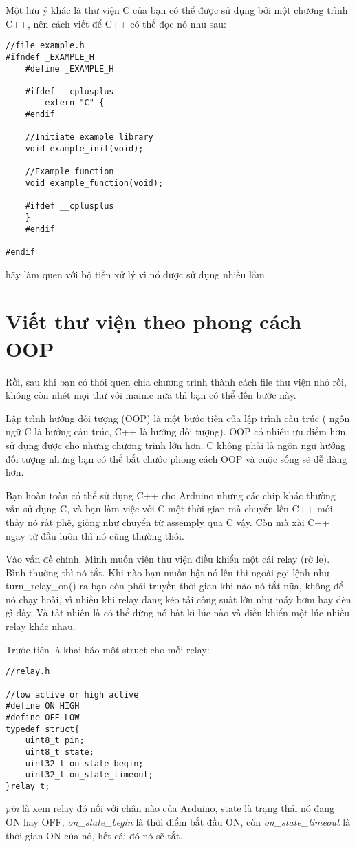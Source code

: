 Một lưu ý khác là thư viện C của bạn có thể được sử dụng bởi một chương trình C++, nên cách viết để C++ có thể đọc nó như sau:
\begin{lstlisting}
//file example.h
#ifndef _EXAMPLE_H
	#define _EXAMPLE_H
	
	#ifdef __cplusplus
 		extern "C" {
	#endif

	//Initiate example library 
	void example_init(void);

	//Example function
	void example_function(void);
	
	#ifdef __cplusplus
	}
	#endif
	
#endif
\end{lstlisting}
hãy làm quen với bộ tiền xử lý vì nó được sử dụng nhiều lắm.
\section{Viết thư viện theo phong cách OOP}

Rồi, sau khi bạn có thói quen chia chương trình thành cách file thư viện nhỏ rồi, không còn nhét mọi thư vôi main.c nữa thì bạn có thể đến bước này.

Lập trình hướng đối tượng (OOP) là một bước tiến của lập trình cấu trúc ( ngôn ngữ C là hướng cấu trúc, C++ là hướng đối tượng). OOP có nhiều ưu điểm hơn, sử dụng được cho những chương trình lớn hơn. C không phải là ngôn ngữ hướng đối tượng nhưng bạn có thể bắt chước phong cách OOP và cuộc sống sẽ dễ dàng hơn.

Bạn hoàn toàn có thể sử dụng C++ cho Arduino nhưng các chip khác thường vẫn sử dụng C, và bạn làm việc với C một thời gian mà chuyển lên C++ mới thấy nó rất phê, giống như chuyển từ assemply qua C vậy. Còn mà xài C++ ngay từ đầu luôn thì nó cũng thường thôi.

Vào vấn đề chính. Mình muốn viến thư viện điều khiển một cái relay (rờ le). Bình thường thì nó tắt. Khi nào bạn muốn bật nó lên thì ngoài gọi lệnh như turn\_relay\_on() ra bạn còn phải truyền thời gian khi nào nó tắt nữa, không để nó chạy hoài, vì nhiều khi relay đang kéo tải công suất lớn như máy bơm hay đèn gì đấy. Và tất nhiên là có thể dừng nó bất kì lúc nào và điều khiển một lúc nhiều relay khác nhau.

Trước tiên là khai báo một struct cho mỗi relay:
\begin{lstlisting}
//relay.h

//low active or high active
#define ON HIGH
#define OFF LOW
typedef struct{
	uint8_t pin;
	uint8_t state;
	uint32_t on_state_begin;
	uint32_t on_state_timeout;
}relay_t;
\end{lstlisting}
\textit{pin} là xem relay đó nối với chân nào của Arduino, state là trạng thái nó đang ON hay OFF, \textit{on\_state\_begin} là thời điểm bắt đầu ON, còn \textit{on\_state\_timeout} là thời gian ON của nó, hết cái đó nó sẽ tắt.

